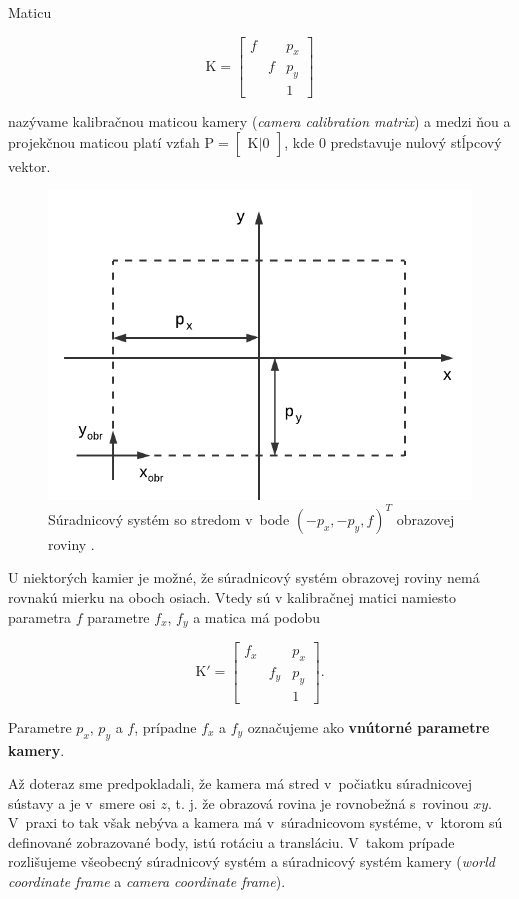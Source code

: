 Maticu

$$ \mathrm{K} 
=
\begin{bmatrix}
f &   &  p_x \\
  & f &  p_y \\
  &   &   1  
\end{bmatrix}
$$

nazývame kalibračnou maticou kamery (\emph{camera calibration matrix}) a medzi ňou a projekčnou maticou platí vzťah
$\mathrm{P} = \begin{bmatrix} \mathrm{K} | 0 \end{bmatrix}$, kde $0$ predstavuje nulový stĺpcový vektor.

\begin{figure}[h!]
    \centering
    \includegraphics[width=0.7\linewidth]{text_prace/obrazky-figures/model_kamery3.pdf}
    \caption{Súradnicový systém so stredom v~bode $(-p_x, -p_y, f)^T$ obrazovej roviny \cite{multiple_view_geometry}.}
    \label{fig:model_kamery3}
\end{figure}

U niektorých kamier je možné, že súradnicový systém obrazovej roviny nemá rovnakú mierku na oboch osiach. Vtedy sú v kalibračnej matici namiesto parametra $f$ parametre $f_x$, $f_y$ a matica má podobu

$$ \mathrm{K'} 
=
\begin{bmatrix}
f_x &     &  p_x \\
    & f_y &  p_y \\
    &     &   1  
\end{bmatrix} \mathrm{.}
$$

Parametre $p_x$, $p_y$ a $f$, prípadne $f_x$ a $f_y$ označujeme ako \textbf{vnútorné parametre kamery}.

Až doteraz sme predpokladali, že kamera má stred v~počiatku súradnicovej sústavy a je  v~smere osi $z$, t. j. že obrazová rovina je rovnobežná s~rovinou $xy$. V~praxi to tak však nebýva a kamera má v~súradnicovom systéme, v~ktorom sú definované zobrazované body, istú rotáciu a transláciu. V~takom prípade rozlišujeme všeobecný súradnicový systém a súradnicový systém kamery (\emph{world coordinate frame} a \emph{camera coordinate frame}).

